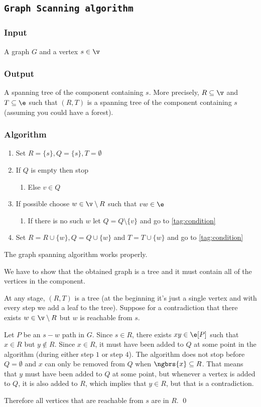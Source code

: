\subsection{\texttt{Graph Scanning algorithm}}
\subsubsection{Input}
A graph $G$ and a vertex $s \in \v$
\subsubsection{Output}
A spanning tree of the component containing $s$. More precisely, $R \subseteq \v$ and $T \subseteq \e$ such that $(R, T)$ is a spanning tree of the component containing $s$ (assuming you could have a forest).
\subsubsection{Algorithm}
\begin{enumerate}
    \item Set $R = \{s\}, Q = \{s\}, T = \emptyset$
    \item \label{tag:condition} If $Q$ is empty then stop
    \begin{enumerate}
        \item Else $v \in Q$
    \end{enumerate}
    \item If possible choose $w \in \v \setminus R$ such that $vw \in \e$
    \begin{enumerate}
        \item If there is no such $w$ let $Q = Q \setminus \{v\}$ and go to \ref{tag:condition}
    \end{enumerate}
    \item Set $R = R \cup \{w\}, Q = Q \cup \{w\}$ and $T = T \cup \{w\}$ and go to \ref{tag:condition}
\end{enumerate}
\begin{customlemma}{1.18}
    \label{lemma:1.18}
    The graph spanning algorithm works properly.
\end{customlemma}
\begin{prf}
    We have to show that the obtained graph is a tree and it must contain all of the vertices in the component.

    At any stage, $(R, T)$ is a tree (at the beginning it's just a single vertex and with every step we add a leaf to the tree). Suppose for a contradiction that there exists $w \in \v \setminus R$ but $w$ is reachable from $s$.

    Let $P$ be an $s - w$ path in $G$. Since $s \in R$, there exists $xy \in \e[P]$ such that $x \in R$ but $y \notin R$. Since $x \in R$, it must have been added to $Q$ at some point in the algorithm (during either step $1$ or step $4$). The algorithm does not stop before $Q = \emptyset$ and $x$ can only be removed from $Q$ when $\ngbrs{x} \subseteq R$. That means that $y$ must have been added to $Q$ at some point, but whenever a vertex is added to $Q$, it is also added to $R$, which implies that $y \in R$, but that is a contradiction.

    Therefore all vertices that are reachable from $s$ are in $R$. \qed
\end{prf}

